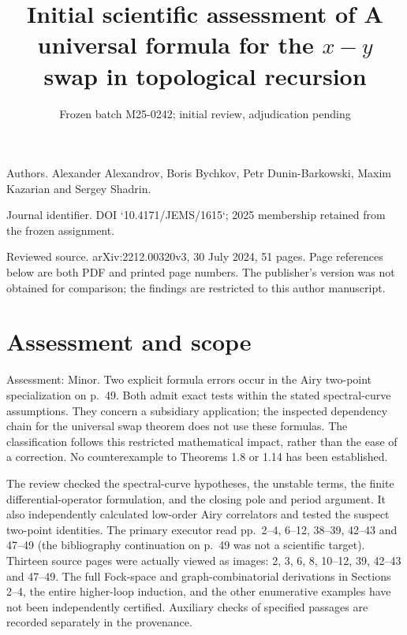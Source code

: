 \documentclass[10pt]{article}
\title{Initial scientific assessment of
A universal formula for the \(x-y\) swap in topological recursion}
\author{}
\date{Frozen batch M25-0242; initial review, adjudication pending}
\begin{document}
\maketitle
Authors. Alexander Alexandrov, Boris Bychkov, Petr Dunin-Barkowski, Maxim Kazarian and Sergey Shadrin.\par
Journal identifier. DOI `10.4171/JEMS/1615`; 2025 membership retained from the frozen assignment.\par
Reviewed source. arXiv:2212.00320v3, 30 July 2024, 51 pages. Page references below are both PDF and printed page numbers. The publisher’s version was not obtained for comparison; the findings are restricted to this author manuscript.\par
\section*{Assessment and scope}
Assessment: Minor. Two explicit formula errors occur in the Airy two-point specialization on p. 49. Both admit exact tests within the stated spectral-curve assumptions. They concern a subsidiary application; the inspected dependency chain for the universal swap theorem does not use these formulas. The classification follows this restricted mathematical impact, rather than the ease of a correction. No counterexample to Theorems 1.8 or 1.14 has been established.\par
The review checked the spectral-curve hypotheses, the unstable terms, the finite differential-operator formulation, and the closing pole and period argument. It also independently calculated low-order Airy correlators and tested the suspect two-point identities. The primary executor read pp. 2–4, 6–12, 38–39, 42–43 and 47–49 (the bibliography continuation on p. 49 was not a scientific target). Thirteen source pages were actually viewed as images: 2, 3, 6, 8, 10–12, 39, 42–43 and 47–49. The full Fock-space and graph-combinatorial derivations in Sections 2–4, the entire higher-loop induction, and the other enumerative examples have not been independently certified. Auxiliary checks of specified passages are recorded separately in the provenance.\par
\end{document}
